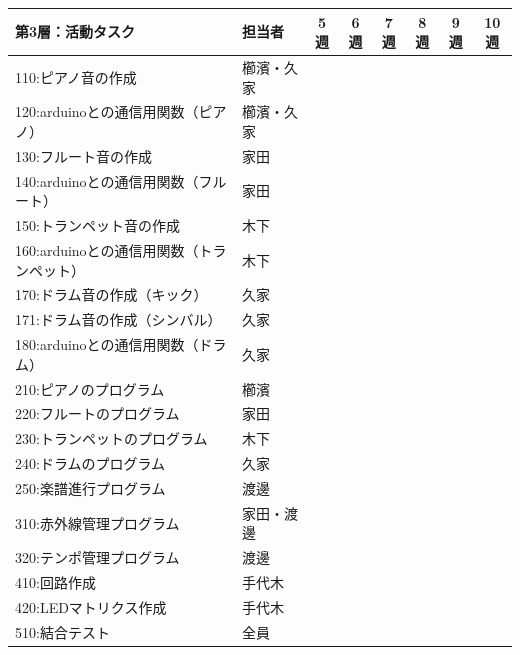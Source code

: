 \documentclass[a4paper,11pt]{ltjsarticle}
\providecommand{\％}{\%}
\begin{document}
\begin{longtable}{|p{6.2cm}|p{2.3cm}|c|c|c|c|c|c|}
\hline
\rowcolor[gray]{0.9}
第3層：活動タスク & 担当者 & 5週 & 6週 & 7週 & 8週 & 9週 & 10週 \\
\hline
110:ピアノ音の作成 & 櫛濱・久家 & \cellcolor{ganttCell} & & \cellcolor{ganttCell} & & & \\
\hline
120:arduinoとの通信用関数（ピアノ） & 櫛濱・久家 & \cellcolor{ganttCell} & & & & & \\
\hline
130:フルート音の作成 & 家田 & \cellcolor{ganttCell} & & & & & \\
\hline
140:arduinoとの通信用関数（フルート） & 家田 & \cellcolor{ganttCell} & & & & & \\
\hline
150:トランペット音の作成 & 木下 & \cellcolor{ganttCell} & & & & & \\
\hline
160:arduinoとの通信用関数（トランペット） & 木下 & \cellcolor{ganttCell} & & & & & \\
\hline
170:ドラム音の作成（キック） & 久家 & & \cellcolor{ganttCell} & & & & \\
\hline
171:ドラム音の作成（シンバル） & 久家 & & \cellcolor{ganttCell} & & & & \\
\hline
180:arduinoとの通信用関数（ドラム） & 久家 & & \cellcolor{ganttCell} & & & & \\
\hline
210:ピアノのプログラム & 櫛濱 & \cellcolor{ganttCell} & & & & & \\
\hline
220:フルートのプログラム & 家田 & \cellcolor{ganttCell} & & & & & \\
\hline
230:トランペットのプログラム & 木下 & \cellcolor{ganttCell} & & & & & \\
\hline
240:ドラムのプログラム & 久家 & & \cellcolor{ganttCell} & & & & \\
\hline
250:楽譜進行プログラム & 渡邊 & & \cellcolor{ganttCell} & \cellcolor{ganttCell} & \cellcolor{ganttCell} & & \\
\hline
310:赤外線管理プログラム & 家田・渡邊 & & \cellcolor{ganttCell} & \cellcolor{ganttCell} & \cellcolor{ganttCell} & & \\
\hline
320:テンポ管理プログラム & 渡邊 & & \cellcolor{ganttCell} & & & & \\
\hline
410:回路作成 & 手代木 & & \cellcolor{ganttCell} & & & & \\
\hline
420:LEDマトリクス作成 & 手代木 & & \cellcolor{ganttCell} & \cellcolor{ganttCell} & \cellcolor{ganttCell} & & \\
\hline
510:結合テスト & 全員 & & & & \cellcolor{ganttCell} & \cellcolor{ganttCell} & \cellcolor{ganttCell} \\
\hline
\end{longtable}
\end{document}
